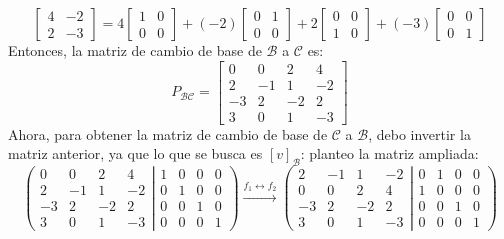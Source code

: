\documentclass[a4paper,12pt]{article}
\begin{document}
$$
\begin{bmatrix}
    4 & -2 \\
    2 & -3
\end{bmatrix}
= 4\begin{bmatrix}
    1 & 0 \\
    0 & 0
\end{bmatrix}
+(-2)\begin{bmatrix}
    0 & 1 \\
    0 & 0
\end{bmatrix}
+2\begin{bmatrix}
    0 & 0 \\
    1 & 0
\end{bmatrix}
+(-3)\begin{bmatrix}
    0 & 0 \\
    0 & 1
\end{bmatrix}
$$
Entonces, la matriz de cambio de base de $\mathcal{B}$ a $\mathcal{C}$ es:
$$
P_{\mathcal{B} \mathcal{C}} = \begin{bmatrix}
    0 & 0 & 2 & 4 \\
    2 & -1 & 1 & -2 \\
    -3 & 2 & -2 & 2 \\
    3 & 0 & 1 & -3
\end{bmatrix}
$$
Ahora, para obtener la matriz de cambio de base de $\mathcal{C}$ a $\mathcal{B}$, debo invertir la matriz anterior, ya que lo que se busca es $[v]_{\mathcal{B}}$:
planteo la matriz ampliada:
$$
\left ( \left.\begin{matrix}
    0 & 0 & 2 & 4 \\ 
    2 & -1 & 1 & -2 \\ 
    -3 & 2 & -2 & 2 \\
    3 & 0 & 1 & -3
    \end{matrix}\right| \begin{matrix}
    1 & 0 & 0 & 0 \\ 
    0 & 1 & 0 & 0 \\ 
    0 & 0 & 1 & 0 \\
    0 & 0 & 0 & 1
    \end{matrix}\right )
\xrightarrow[]{f_1 \leftrightarrow f_2}
\left ( \left.\begin{matrix}
    2 & -1 & 1 & -2 \\ 
    0 & 0 & 2 & 4 \\ 
    -3 & 2 & -2 & 2 \\
    3 & 0 & 1 & -3
    \end{matrix}\right| \begin{matrix}
    0 & 1 & 0 & 0 \\ 
    1 & 0 & 0 & 0 \\ 
    0 & 0 & 1 & 0 \\
    0 & 0 & 0 & 1
    \end{matrix}\right )
$$
\end{document}
